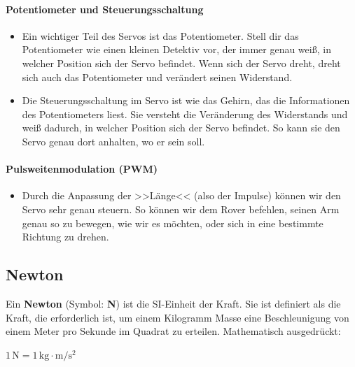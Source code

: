 \documentclass{vorlage-design-main}
\begin{document}
\hypertarget{potentiometer-und-steuerungsschaltung}{%
\paragraph{Potentiometer und
Steuerungsschaltung}\label{potentiometer-und-steuerungsschaltung}}

\begin{itemize}

\item
  Ein wichtiger Teil des Servos ist das Potentiometer. Stell dir das
  Potentiometer wie einen kleinen Detektiv vor, der immer genau weiß, in
  welcher Position sich der Servo befindet. Wenn sich der Servo dreht,
  dreht sich auch das Potentiometer und verändert seinen Widerstand.
\item
  Die Steuerungsschaltung im Servo ist wie das Gehirn, das die
  Informationen des Potentiometers liest. Sie versteht die Veränderung
  des Widerstands und weiß dadurch, in welcher Position sich der Servo
  befindet. So kann sie den Servo genau dort anhalten, wo er sein soll.
\end{itemize}

\hypertarget{pulsweitenmodulation-pwm}{%
\paragraph{Pulsweitenmodulation (PWM)}\label{pulsweitenmodulation-pwm}}

\begin{itemize}

\item
  Durch die Anpassung der >>Länge<< (also der Impulse) können wir den
  Servo sehr genau steuern. So können wir dem Rover befehlen, seinen Arm
  genau so zu bewegen, wie wir es möchten, oder sich in eine bestimmte
  Richtung zu drehen.
\end{itemize}

\hypertarget{newton}{%
\subsection{Newton}\label{newton}}

Ein \textbf{Newton} (Symbol: \textbf{N}) ist die SI-Einheit der Kraft.
Sie ist definiert als die Kraft, die erforderlich ist, um einem
Kilogramm Masse eine Beschleunigung von einem Meter pro Sekunde im
Quadrat zu erteilen. Mathematisch ausgedrückt:

$1 \, \text{N} = 1 \, \text{kg} \cdot \text{m} / \text{s}^2$
\end{document}
